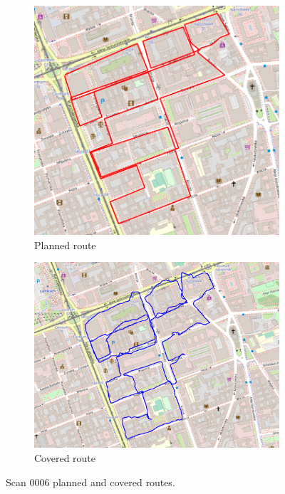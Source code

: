 \documentclass[a4paper,12pt]{article}
\begin{document}
\begin{enumerate}
\begin{figure}[H]
\begin{subfigure}{.80\textwidth}
		\includegraphics[width=1\linewidth]{route_p6}
		\caption{Planned route}
		\label{fig:a6}
	\end{subfigure}%
	\linebreak
	\begin{subfigure}{.80\textwidth}
		\centering
		\includegraphics[width=1\linewidth]{route_c6}
		\caption{Covered route}
		\label{fig:b6}
	\end{subfigure}
	\caption{Scan 0006 planned and covered routes.}
	\label{fig:fig6}
\end{figure} 
\end{enumerate}
\end{document}
